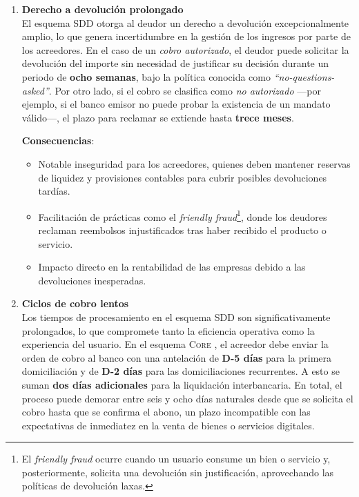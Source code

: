\begin{enumerate}[label=\textbf{\arabic*.}, leftmargin=0.75cm]
  \item \textbf{Derecho a devolución prolongado}\\
        El esquema SDD otorga al deudor un derecho a devolución excepcionalmente amplio, lo que genera incertidumbre en la gestión de los ingresos por parte de los acreedores. En el caso de un \emph{cobro autorizado}, el deudor puede solicitar la devolución del importe sin necesidad de justificar su decisión durante un periodo de \textbf{ocho semanas}, bajo la política conocida como \emph{“no-questions-asked”}. Por otro lado, si el cobro se clasifica como \emph{no autorizado} —por ejemplo, si el banco emisor no puede probar la existencia de un mandato válido—, el plazo para reclamar se extiende hasta \textbf{trece meses}.
        
        \textbf{Consecuencias}:
        \begin{itemize}
          \item Notable inseguridad para los acreedores, quienes deben mantener reservas de liquidez y provisiones contables para cubrir posibles devoluciones tardías.
          \item Facilitación de prácticas como el \emph{friendly fraud}\footnote{El \emph{friendly fraud} ocurre cuando un usuario consume un bien o servicio y, posteriormente, solicita una devolución sin justificación, aprovechando las políticas de devolución laxas.}, donde los deudores reclaman reembolsos injustificados tras haber recibido el producto o servicio.
          \item Impacto directo en la rentabilidad de las empresas debido a las devoluciones inesperadas.
        \end{itemize}

  \item \textbf{Ciclos de cobro lentos}\\
        Los tiempos de procesamiento en el esquema SDD son significativamente prolongados, lo que compromete tanto la eficiencia operativa como la experiencia del usuario. En el esquema \textsc{Core} \cite{epc016}, el acreedor debe enviar la orden de cobro al banco con una antelación de \textbf{D-5 días} para la primera domiciliación y de \textbf{D-2 días} para las domiciliaciones recurrentes. A esto se suman \textbf{dos días adicionales} para la liquidación interbancaria. En total, el proceso puede demorar entre seis y ocho días naturales desde que se solicita el cobro hasta que se confirma el abono, un plazo incompatible con las expectativas de inmediatez en la venta de bienes o servicios digitales.
        

\end{enumerate}
